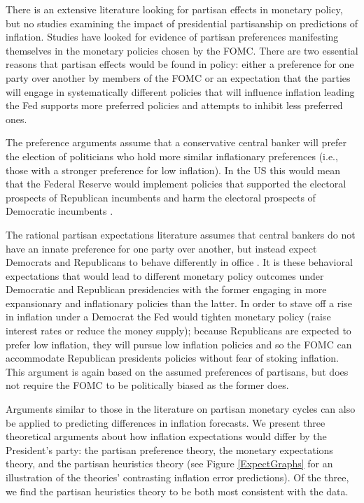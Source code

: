\documentclass[a4paper]{article}\usepackage{graphicx, color}
\begin{document}
There is an extensive literature looking for partisan effects in monetary policy, but no studies examining the impact of presidential partisanship on predictions of inflation. Studies have looked for evidence of partisan preferences manifesting themselves in the monetary policies chosen by the FOMC. There are two essential reasons that partisan effects would be found in policy: either a preference for one party over another by members of the FOMC or an expectation that the parties will engage in systematically different policies that will influence inflation leading the Fed supports more preferred policies and attempts to inhibit less preferred ones. 

The preference arguments assume that a conservative central banker will prefer the election of politicians who hold more similar inflationary preferences (i.e., those with a stronger preference for low inflation). In the US this would mean that the Federal Reserve would implement policies that supported the electoral prospects of Republican incumbents and harm the electoral prospects of Democratic incumbents \citep{Clark2012,Hakes1988,Sieg1997,Tootell1996}.

The rational partisan expectations literature assumes that central bankers do not have an innate preference for one party over another, but instead expect Democrats and Republicans to behave differently in office \citep{Alesina1991,Hibbs1994}. It is these behavioral expectations that would lead to different monetary policy outcomes under Democratic and Republican presidencies with the former engaging in more expansionary and inflationary policies than the latter. In order to stave off a rise in inflation under a Democrat the Fed would tighten monetary policy (raise interest rates or reduce the money supply); because Republicans are expected to prefer low inflation, they will pursue low inflation policies and so the FOMC can accommodate Republican presidents policies without fear of stoking inflation. This argument is again based on the assumed preferences of partisans, but does not require the FOMC to be politically biased as the former does. 

Arguments similar to those in the literature on partisan monetary cycles can also be applied to predicting differences in inflation forecasts. We present three theoretical arguments about how inflation expectations would differ by the President's party: the partisan preference theory, the monetary expectations theory, and the partisan heuristics theory (see Figure \ref{ExpectGraphs} for an illustration of the theories' contrasting inflation error predictions). Of
the three, we find the partisan heuristics theory to be both most consistent with the data.
\end{document}
